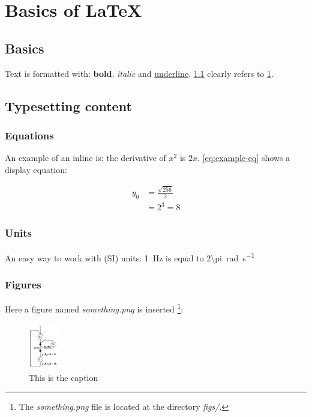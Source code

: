 \chapter{Basics of LaTeX} \label{cha:basics}

\section{Basics} \label{sec:basics}
Text is formatted with: \textbf{bold}, \textit{italic} and \underline{underline}. \cref{sec:basics} clearly refers to \cref{cha:basics}.

\section{Typesetting content}

\subsection{Equations}

An example of an inline is: the derivative of $x^2$ is $2x$. \cref{eq:example-eq} shows a display equation:

\begin{eqnarray}
  y_{0} &= \frac{\sqrt{256}}{2} \\
        &= 2^{3} = 8 \nonumber
  \label{eq:example-eq}
\end{eqnarray}

\subsection{Units}

An easy way to work with (SI) units: \SI{1}{\hertz} is equal to \SI{2\pi}{\radian\per\second}

\subsection{Figures}

Here a figure named \textit{something.png} is inserted \footnote{The \textit{something.png} file is located at the directory \textit{figs/}.}:
\begin{figure}[h]
  \centering
  \includegraphics[height=20mm]{figs/something.png}
  \caption{This is the caption}
  \label{fig:something}
\end{figure}

